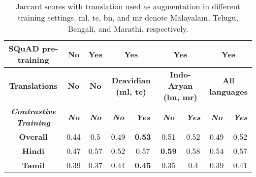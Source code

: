 \documentclass[11pt]{article}
\begin{document}
\begin{table*}[!hbt]
\centering
\begin{tabular}{|c|c|c|cc|cc|cc|}
\hline
\textbf{SQuAD pre-training}            & \textbf{No}          & \textbf{Yes}         & \multicolumn{2}{c|}{\textbf{Yes}}                & \multicolumn{2}{c|}{\textbf{Yes}}                 & \multicolumn{2}{c|}{\textbf{Yes}}             \\
\hline
\textbf{Translations}                  & \textbf{No}          & \textbf{No}          & \multicolumn{2}{c|}{\textbf{Dravidian (ml, te)}} & \multicolumn{2}{c|}{\textbf{Indo-Aryan (bn, mr)}} & \multicolumn{2}{c|}{\textbf{All languages}}   \\
\hline
\textit{\textbf{Contrastive Training}} & \textit{\textbf{No}} & \textit{\textbf{No}} & \textit{\textbf{No}}   & \textit{\textbf{Yes}}  & \textit{\textbf{No}}   & \textit{\textbf{Yes}}   & \textit{\textbf{No}} & \textit{\textbf{Yes}} \\
\hline
\textbf{Overall}                       & 0.44                 & 0.5                  & 0.49                   & \textbf{0.53}          & 0.51                   & 0.52                    & 0.49                 & 0.52                  \\
\textbf{Hindi}                         & 0.47                 & 0.57                 & 0.52                   & 0.57                   & \textbf{0.59}          & 0.58                    & 0.54                 & 0.57                  \\
\textbf{Tamil}                         & 0.39                 & 0.37                 & 0.44                   & \textbf{0.45}          & 0.35                   & 0.4                     & 0.39                 & 0.41 \\
\hline
\end{tabular}
\caption{Jaccard scores with translation used as augmentation in different training settings. ml, te, bn, and mr denote Malayalam, Telugu, Bengali, and Marathi, respectively.}
\label{table:trans}
\end{table*}
\end{document}
